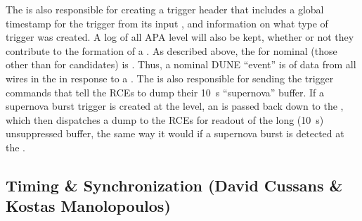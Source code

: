 	
The  is also responsible for creating a trigger header that
includes a global timestamp for the trigger from its input
, and information on what type of trigger was
created. 
A log of all APA level  will also be kept,
whether or not they contribute to the formation of a
. 
As described above, the  for nominal
 (those other than for  candidates) is
\readout.
Thus, a nominal DUNE ``event'' is \readout of data from all wires
in the   in response to a 
. 
The  is also responsible for sending the trigger commands
that tell the RCEs to dump their \SI{10}{\s} ``supernova'' buffer. 
If a supernova burst trigger is created at the  level, an
 is passed back down to the , which
then dispatches a dump  to the RCEs for readout of
the long (\SI{10}{\s}) unsuppressed buffer, the same way it would if a
supernova burst is detected at the .


	


%

%
%
%

\subsection{Timing \& Synchronization (David Cussans \& Kostas Manolopoulos)}
\label{sec:fdsp-daq-timing}


